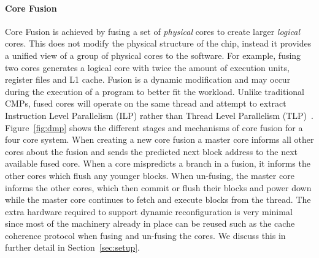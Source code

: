 \paragraph{Core Fusion} 
Core Fusion is achieved by fusing a set of \textit{physical} cores to create larger \textit{logical} cores.
This does not modify the physical structure of the chip, instead it provides a unified view of a group of physical cores to the software.
For example, fusing two cores generates a logical core with twice the amount of execution units, register files and L1 cache.
Fusion is a dynamic modification and may occur during the execution of a program to better fit the workload.
Unlike traditional CMPs, fused cores will operate on the same thread and attempt to extract Instruction Level Parallelism (ILP) rather than Thread Level Parallelism (TLP)~\cite{micolet2016dmpstream,pricopi2012bahurupi}.
Figure~\ref{fig:dmp} shows the different stages and mechanisms of core fusion for a four core system.
When creating a new core fusion a master core informs all other cores about the fusion and sends the predicted next block address to the next available fused core.
When a core mispredicts a branch in a fusion, it informs the other cores which flush any younger blocks.
When un-fusing, the master core informs the other cores, which then commit or flush their blocks and power down while the master core continues to fetch and execute blocks from the thread.
The extra hardware required to support dynamic reconfiguration is very minimal~\cite{kim2007tflex} since most of the machinery already in place can be reused such as the cache coherence protocol when fusing and un-fusing the cores.
We discuss this in further detail in Section~\ref{sec:setup}.

